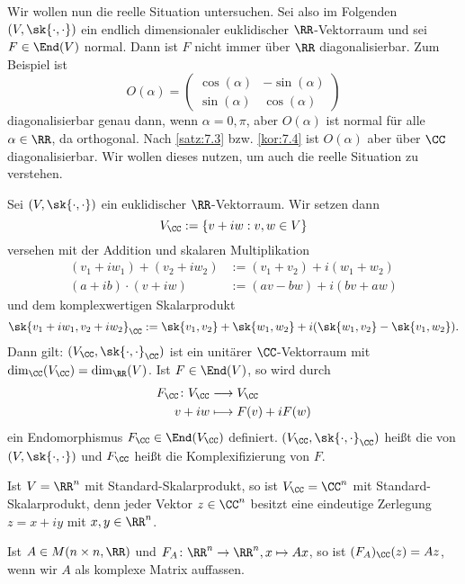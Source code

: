 Wir wollen nun die reelle Situation untersuchen.
Sei also im Folgenden $(V,\sk{\cdot,\cdot})$ ein endlich dimensionaler euklidischer $\RR$-Vektorraum und sei $F \in \End(V)$ normal.
Dann ist $F$ nicht immer über $\RR$ diagonalisierbar.
Zum Beispiel ist
\[
	O(\alpha) = \begin{pmatrix}
		\cos(\alpha) & -\sin(\alpha) \\
		\sin(\alpha) & \cos(\alpha)
	\end{pmatrix}
\]
diagonalisierbar genau dann, wenn $\alpha = 0,\pi$, aber $O(\alpha)$ ist normal für alle $\alpha \in \RR$, da orthogonal.
Nach \autoref{satz:7.3} bzw. \autoref{kor:7.4} ist $O(\alpha)$ aber über $\CC$ diagonalisierbar.
Wir wollen dieses nutzen, um auch die reelle Situation zu verstehen.

\begin{definition}[Komplexifizierung]
	\label{def:7.5}
	Sei $(V,\sk{\cdot,\cdot})$ ein euklidischer $\RR$-Vektorraum.
	Wir setzen dann
	\[
		V_{\CC} := \{ v+iw : v,w \in V\}
	\]
	versehen mit der Addition und skalaren Multiplikation
	\begin{align*}
		(v_1 + iw_1) + (v_2 + iw_2) &:= (v_1+v_2) + i(w_1 + w_2) \\
		(a+ib) \cdot (v + iw) &:= (av - bw) + i (bv + aw)
	\end{align*}
	und dem komplexwertigen Skalarprodukt
	\[
		\sk{v_1+iw_1,v_2+iw_2}_{\CC} := \sk{v_1,v_2} + \sk{w_1,w_2} + i(\sk{w_1,v_2}-\sk{v_1,w_2}).
	\]
	Dann gilt:
	$(V_{\CC},\sk{\cdot,\cdot}_{\CC})$ ist ein unitärer $\CC$-Vektorraum mit $\dim_{\CC}(V_{\CC}) = \dim_{\RR}(V)$.
	Ist $F \in \End(V)$, so wird durch
	\begin{align*}
		F_{\CC}\colon V_{\CC} &\longrightarrow V_{\CC} \\
		v+iw &\longmapsto F(v) + i F(w)
	\end{align*}
	ein Endomorphismus $F_{\CC} \in \End(V_{\CC})$ definiert.
	$(V_{\CC},\sk{\cdot,\cdot}_{\CC})$ heißt die  von $(V,\sk{\cdot,\cdot})$ und $F_{\CC}$ heißt die Komplexifizierung von $F$.
\end{definition}

\begin{beispiel}
	\label{bsp:7.6}
	Ist $V = \RR^n$ mit Standard-Skalarprodukt, so ist $V_{\CC} = \CC^n$ mit Standard-Skalarprodukt, denn jeder Vektor $z \in \CC^n$ besitzt eine eindeutige Zerlegung $z = x+ iy$ mit $x,y \in \RR^n$.
	
	Ist $A \in M(n \times n,\RR)$ und $F_A\colon \RR^n \rightarrow \RR^n, x \mapsto Ax$, so ist $(F_A)_{\CC}(z) = Az$, wenn wir $A$ als komplexe Matrix auffassen.
\end{beispiel}

